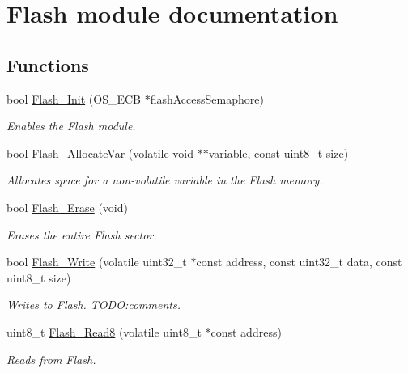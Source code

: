 \hypertarget{group___flash__module}{}\section{Flash module documentation}
\label{group___flash__module}
\subsection*{Functions}
\begin{DoxyCompactItemize}
\item 
bool \hyperlink{group___flash__module_gab6bef2c581b902a2bca7a0d04409ad30}{Flash\+\_\+\+Init} (O\+S\+\_\+\+E\+C\+B $\ast$flash\+Access\+Semaphore)
\begin{DoxyCompactList}\small\item\em Enables the Flash module. \end{DoxyCompactList}\item 
bool \hyperlink{group___flash__module_ga50871aff0f5af1e092aea3ed2545cf72}{Flash\+\_\+\+Allocate\+Var} (volatile void $\ast$$\ast$variable, const uint8\+\_\+t size)
\begin{DoxyCompactList}\small\item\em Allocates space for a non-\/volatile variable in the Flash memory. \end{DoxyCompactList}\item 
bool \hyperlink{group___flash__module_ga06868787ccef73e69bd236d3b93b68f3}{Flash\+\_\+\+Erase} (void)
\begin{DoxyCompactList}\small\item\em Erases the entire Flash sector. \end{DoxyCompactList}\item 
bool \hyperlink{group___flash__module_gab920a95573638276676b5a9417e282fd}{Flash\+\_\+\+Write} (volatile uint32\+\_\+t $\ast$const address, const uint32\+\_\+t data, const uint8\+\_\+t size)
\begin{DoxyCompactList}\small\item\em Writes to Flash. T\+O\+D\+O\+:comments. \end{DoxyCompactList}\item 
uint8\+\_\+t \hyperlink{group___flash__module_ga10da7ee9a2d8d8bc4bc6fc698c9197ac}{Flash\+\_\+\+Read8} (volatile uint8\+\_\+t $\ast$const address)
\begin{DoxyCompactList}\small\item\em Reads from Flash. \end{DoxyCompactList}\item 
$$
\end{DoxyCompactItemize}
